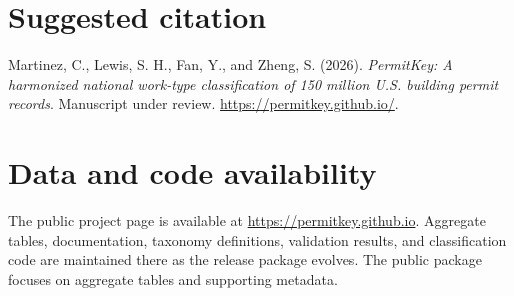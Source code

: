 \documentclass[11pt]{article}
\begin{document}
\section*{Suggested citation}
Martinez, C., Lewis, S. H., Fan, Y., and Zheng, S. (2026). \emph{PermitKey: A harmonized national work-type classification of 150 million U.S. building permit records}. Manuscript under review. \url{https://permitkey.github.io/}.

\section*{Data and code availability}
The public project page is available at \url{https://permitkey.github.io}. Aggregate tables, documentation, taxonomy definitions, validation results, and classification code are maintained there as the release package evolves. The public package focuses on aggregate tables and supporting metadata.
\end{document}
